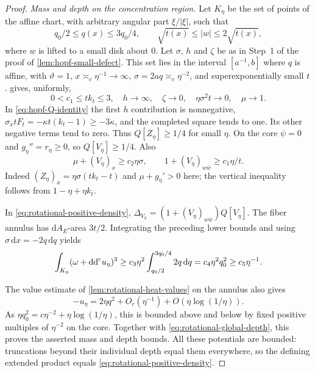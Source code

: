 \begin{proof}
\medskip\noindent\emph{Mass and depth on the concentration region.}
Let $K_\eta$ be the set of points of the affine chart, with arbitrary angular part $\xi/|\xi|$, such that
\[
 q_0/2\leq q(x)\leq3q_0/4,\qquad
 \sqrt{t(x)}\leq|w|\leq2\sqrt{t(x)},
\]
where $w$ is lifted to a small disk about $0$. Let $\sigma$, $h$ and $\zeta$ be as in Step~1 of the proof of \cref{lem:hopf-small-defect}.
This set lies in the interval $[a^{-1},b]$ where $q$ is affine, with $\vartheta=1$,
$x\asymp_c\eta^{-1}\to\infty$, $\sigma=2aq\asymp_c\eta^{-2}$, and
superexponentially small $t$.  gives, uniformly,
\[
 0<c_1\leq tk_t\leq3,\quad h\to\infty,\quad
 \zeta\to0,\quad \eta\sigma^2t\to0,\quad \mu\to1.
\]
In \eqref{eq:hopf-Q-identity} the first $h$ contribution is nonnegative,
$\sigma_xtF_t=-\kappa t(k_t-1)\geq-3\kappa$, and the completed square
tends to one. Its other negative terms tend to zero.
Thus $Q[Z_\eta]\geq1/4$ for small $\eta$. On the core $\psi=0$ and
$g_\eta''=r_\eta\geq0$, so $Q[V_\eta]\geq1/4$. Also
\[
 \mu+(V_\eta)_x\geq c_2\eta\sigma,\qquad
 1+(V_\eta)_{w\bar w}\geq c_1\eta/t.
\]
Indeed $(Z_\eta)_x=\eta\sigma(tk_t-t)$ and $\mu+g_\eta'>0$ here;
the vertical inequality follows from $1-\eta+\eta k_t$.

In \eqref{eq:rotational-positive-density}, $\Delta_{V_\eta}=(1+(V_\eta)_{w\bar w})Q[V_\eta]$. The fiber annulus has $\mathrm dA_E$-area $3t/2$.
Integrating the preceding lower bounds and using
$\sigma\,\mathrm dx=-2q\,\mathrm dq$ yields
\[
 \int_{K_\eta}(\omega+\mathrm{dd}^{\mathrm{c}} u_\eta)^3
 \geq c_3\eta^2\int_{q_0/2}^{3q_0/4}2q\,\mathrm dq
 =c_4\eta^2q_0^2\geq c_5\eta^{-1}.
\]

The value estimate of \cref{lem:rotational-heat-values} on the annulus also gives
\[
 -u_\eta=2\eta q^2+O_c(\eta^{-1})+O(\eta\log(1/\eta)).
\]
As $\eta q_0^2=c\eta^{-2}+\eta\log(1/\eta)$, this is bounded above and below
by fixed positive multiples of $\eta^{-2}$ on the core.
Together with \eqref{eq:rotational-global-depth}, this proves the asserted mass and depth bounds.
All these potentials are bounded: truncations beyond their individual depth
equal them everywhere, so the defining extended product equals
\eqref{eq:rotational-positive-density}.
\end{proof}

